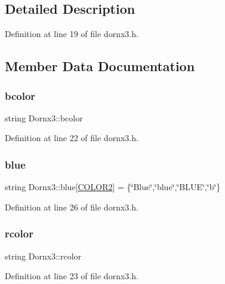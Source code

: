 \subsection{Detailed Description}


Definition at line 19 of file dornx3.\+h.



\subsection{Member Data Documentation}
\mbox{\label{class_dornx3_ab2a8fd3713629e06177cf91b7221b82b}} 
\subsubsection{\texorpdfstring{bcolor}{bcolor}}
{\footnotesize\ttfamily string Dornx3\+::bcolor}



Definition at line 22 of file dornx3.\+h.

\mbox{\label{class_dornx3_ad4294dbbc1608b76c5e49736b3bb8a86}} 
\subsubsection{\texorpdfstring{blue}{blue}}
{\footnotesize\ttfamily string Dornx3\+::blue\mbox{[}\hyperlink{dornx3_8h_afd1642892fe952b92046b3b290301c66}{C\+O\+L\+O\+R2}\mbox{]} = \{\char`\"{}Blue\char`\"{},\char`\"{}blue\char`\"{},\char`\"{}B\+L\+UE\char`\"{},\char`\"{}b\char`\"{}\}}



Definition at line 26 of file dornx3.\+h.

\mbox{\label{class_dornx3_afb914249485c727f99503ac24e5b444f}} 
\subsubsection{\texorpdfstring{rcolor}{rcolor}}
{\footnotesize\ttfamily string Dornx3\+::rcolor}



Definition at line 23 of file dornx3.\+h.


